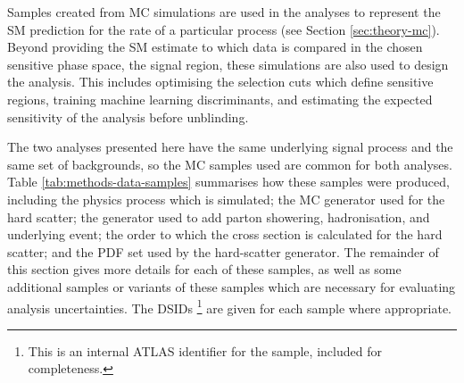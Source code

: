 
Samples created from \ac{MC} simulations are used in the analyses to represent
the \ac{SM} prediction for the rate of a particular process (see Section
\ref{sec:theory-mc}). Beyond providing the \ac{SM} estimate to which data is
compared in the chosen sensitive phase space, the signal region, these
simulations are also used to design the analysis. This includes optimising
the selection cuts which define sensitive regions, training machine learning
discriminants, and estimating the expected sensitivity of the analysis before
unblinding.

The two analyses presented here have the same underlying signal process and the
same set of backgrounds, so the \ac{MC} samples used are common for both
analyses. Table \ref{tab:methods-data-samples} summarises how these samples
were produced, including the physics process which is simulated; the \ac{MC}
generator used for the hard scatter; the generator used to add parton showering,
hadronisation, and underlying event; the order to which the cross section is
calculated for the hard scatter; and the \ac{PDF} set used by the hard-scatter
generator. The remainder of this section gives more details for each of
these samples, as well as some additional samples or variants of these samples
which are necessary for evaluating analysis uncertainties. The \acp{DSID}%
\footnote{
  This is an internal \acs{ATLAS} identifier for the sample, included for
  completeness.
}
are given for each sample where appropriate.

